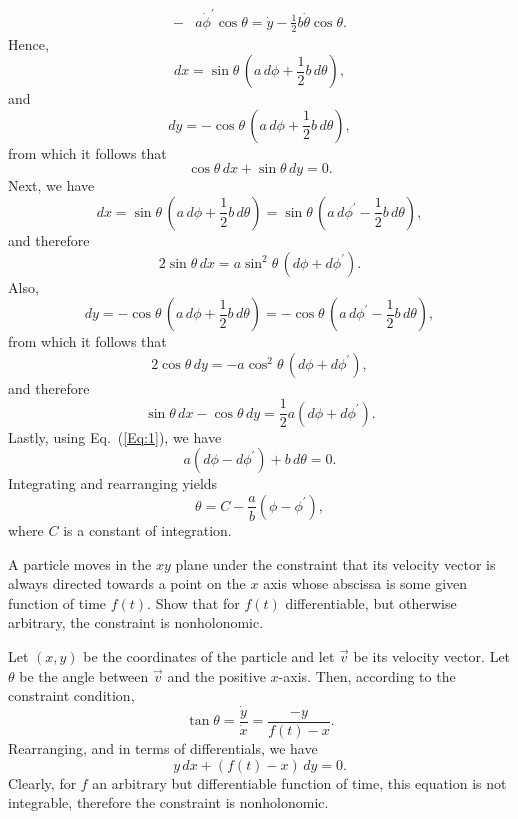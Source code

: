 \begin{questions}
\begin{solution}
\begin{align*}
-&a \dot{\phi}^\prime \cos \theta  = \dot{y} - \frac{1}{2} b \dot{\theta} \cos \theta. 
\end{align*}
Hence,
\[
dx = \sin \theta \, ( a \, d\phi + \frac{1}{2} b \, d\theta ) ,
\]
and
\[
dy = -\cos \theta \, ( a \, d\phi + \frac{1}{2} b \, d\theta ),
\]
from which it follows that
\[
\cos \theta \, dx + \sin \theta \, dy = 0.
\]
Next, we have
\begin{equation} \label{Eq:1}
dx = \sin \theta \, ( a \, d\phi + \frac{1}{2} b \, d\theta) = \sin \theta \, ( a \, d\phi^\prime - \frac{1}{2} b \, d\theta),
\end{equation}
and therefore
\[
2 \sin \theta \, dx = a \sin^2 \theta \, ( d\phi + d\phi^\prime ).
\]
Also,
\[
dy = -\cos \theta \, ( a \, d\phi + \frac{1}{2} b \, d\theta ) = -\cos \theta \, ( a \, d\phi^\prime - \frac{1}{2} b \, d\theta ),
\]
from which it follows that
\[
2 \cos \theta \, dy = -a \cos^2 \theta \, ( d\phi + d\phi^\prime ),
\]
and therefore 
\[
\sin \theta \, dx - \cos \theta \, dy = \frac{1}{2} a ( d\phi + d\phi^\prime ).
\]
Lastly, using Eq.~(\ref{Eq:1}), we have
\[
a ( d\phi - d\phi^\prime ) + b \, d\theta = 0.
\]
Integrating and rearranging yields
\[
\theta = C - \frac{a}{b} ( \phi - \phi^\prime ),
\]
where $C$ is a constant of integration. 
\end{solution}

\question A particle moves in the $xy$ plane under the constraint that its velocity vector is always directed towards a point on the $x$ axis whose abscissa is some given function of time $f(t)$. Show that for $f(t)$ differentiable, but otherwise arbitrary, the constraint is nonholonomic.
\begin{solution}
Let $( x, y )$ be the coordinates of the particle and let $\vec{v}$ be its velocity vector. Let $\theta$ be the angle between $\vec{v}$ and the positive $x$-axis. Then, according to the constraint condition,
\[
\tan \theta = \frac{\dot{y}}{\dot{x}} = \frac{-y}{f(t) - x}.
\]
Rearranging, and in terms of differentials, we have
\[
y \, dx + ( f(t) - x ) \, dy = 0.
\]
Clearly, for $f$ an arbitrary but differentiable function of time, this equation is not integrable, therefore the constraint is nonholonomic. 
\end{solution}


\end{questions}

